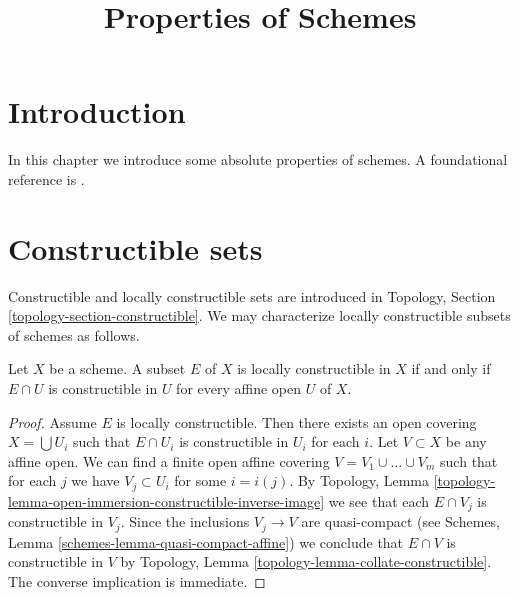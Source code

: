 

%


\title{Properties of Schemes}


\maketitle

\label{section-phantom}

\tableofcontents

\section{Introduction}
\label{section-introduction}

\noindent
In this chapter we introduce some absolute properties of schemes.
A foundational reference is \cite{EGA}.




\section{Constructible sets}
\label{section-constructible}

\noindent
Constructible and locally constructible sets are introduced in
Topology, Section \ref{topology-section-constructible}.
We may characterize locally constructible subsets of schemes as
follows.

\begin{lemma}
\label{lemma-locally-constructible}
Let $X$ be a scheme.
A subset $E$ of $X$ is locally constructible in $X$ if and only if
$E \cap U$ is constructible in $U$ for every affine open $U$ of $X$.
\end{lemma}

\begin{proof}
Assume $E$ is locally constructible. Then there exists an open covering
$X = \bigcup U_i$ such that $E \cap U_i$ is constructible in $U_i$
for each $i$. Let $V \subset X$ be any affine open. We can find a finite
open affine covering $V = V_1 \cup \ldots \cup V_m$ such that for each $j$
we have $V_j \subset U_i$ for some $i = i(j)$. By
Topology, Lemma \ref{topology-lemma-open-immersion-constructible-inverse-image}
we see that each $E \cap V_j$ is constructible in $V_j$. Since the inclusions
$V_j \to V$ are quasi-compact (see
Schemes, Lemma \ref{schemes-lemma-quasi-compact-affine})
we conclude that $E \cap V$ is constructible in $V$ by
Topology, Lemma \ref{topology-lemma-collate-constructible}.
The converse implication is immediate.
\end{proof}

